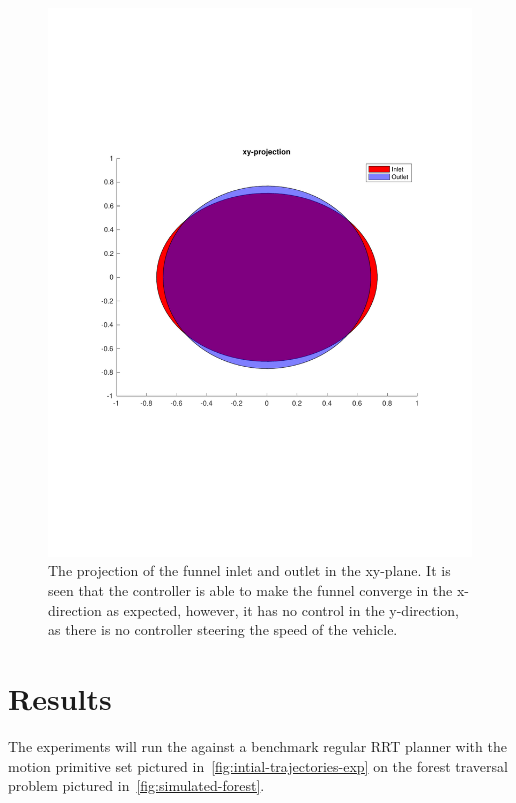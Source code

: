 \begin{figure}
\centering
\includegraphics[scale=.5]{figures/experiments/funnel-inlet-outlet}
\caption{The projection of the funnel inlet and outlet in the xy-plane. It is
  seen that the controller is able to make the funnel converge in the
  x-direction as expected, however, it has no control in the y-direction, as
  there is no controller steering the speed of the vehicle.}
\label{fig:funnel-inlet-outlet}
\end{figure}

\section{Results}
\label{sec:experiments-final}

The experiments will run the \rrtfunnel{} against a benchmark regular RRT
planner with the motion primitive set pictured
in~\cref{fig:intial-trajectories-exp} on the forest traversal problem pictured
in~\cref{fig:simulated-forest}.

